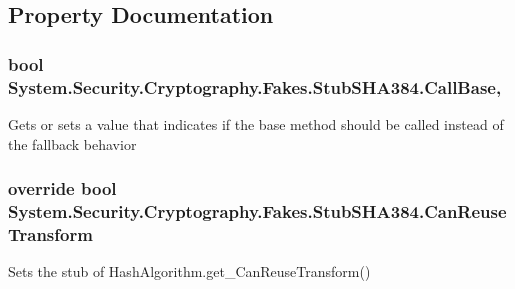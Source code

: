 \subsection{Property Documentation}
\hypertarget{class_system_1_1_security_1_1_cryptography_1_1_fakes_1_1_stub_s_h_a384_a0f90ec3333540c8e7bb7359f7b7d364f}{
\subsubsection[{Call\-Base}]{\setlength{\rightskip}{0pt plus 5cm}bool System.\-Security.\-Cryptography.\-Fakes.\-Stub\-S\-H\-A384.\-Call\-Base\hspace{0.3cm}{\ttfamily [get]}, {\ttfamily [set]}}}\label{class_system_1_1_security_1_1_cryptography_1_1_fakes_1_1_stub_s_h_a384_a0f90ec3333540c8e7bb7359f7b7d364f}


Gets or sets a value that indicates if the base method should be called instead of the fallback behavior

\hypertarget{class_system_1_1_security_1_1_cryptography_1_1_fakes_1_1_stub_s_h_a384_a086b869e823831224aab3fd1f48b24ce}{
\subsubsection[{Can\-Reuse\-Transform}]{\setlength{\rightskip}{0pt plus 5cm}override bool System.\-Security.\-Cryptography.\-Fakes.\-Stub\-S\-H\-A384.\-Can\-Reuse\-Transform\hspace{0.3cm}{\ttfamily [get]}}}\label{class_system_1_1_security_1_1_cryptography_1_1_fakes_1_1_stub_s_h_a384_a086b869e823831224aab3fd1f48b24ce}


Sets the stub of Hash\-Algorithm.\-get\-\_\-\-Can\-Reuse\-Transform()

